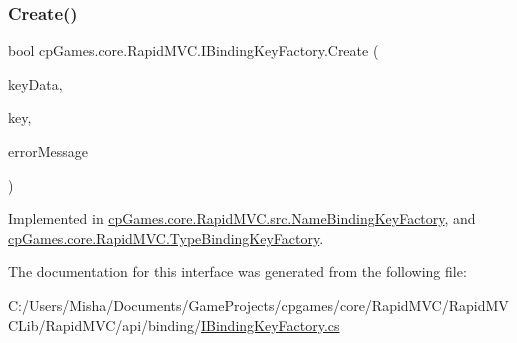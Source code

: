 \subsubsection{\texorpdfstring{Create()}{Create()}}
{\footnotesize\ttfamily bool cp\+Games.\+core.\+Rapid\+M\+V\+C.\+I\+Binding\+Key\+Factory.\+Create (\begin{DoxyParamCaption}\item[{object}]{key\+Data,  }\item[{out \mbox{\hyperlink{interfacecp_games_1_1core_1_1_rapid_m_v_c_1_1_i_binding_key}{I\+Binding\+Key}}}]{key,  }\item[{out string}]{error\+Message }\end{DoxyParamCaption})}



Implemented in \mbox{\hyperlink{classcp_games_1_1core_1_1_rapid_m_v_c_1_1src_1_1_name_binding_key_factory_a12bc08a62a5c91a8e1b8c8f6ed280cb6}{cp\+Games.\+core.\+Rapid\+M\+V\+C.\+src.\+Name\+Binding\+Key\+Factory}}, and \mbox{\hyperlink{classcp_games_1_1core_1_1_rapid_m_v_c_1_1_type_binding_key_factory_ab895639911e562ea6bbb1141911496af}{cp\+Games.\+core.\+Rapid\+M\+V\+C.\+Type\+Binding\+Key\+Factory}}.



The documentation for this interface was generated from the following file\+:\begin{DoxyCompactItemize}
\item 
C\+:/\+Users/\+Misha/\+Documents/\+Game\+Projects/cpgames/core/\+Rapid\+M\+V\+C/\+Rapid\+M\+V\+C\+Lib/\+Rapid\+M\+V\+C/api/binding/\mbox{\hyperlink{_i_binding_key_factory_8cs}{I\+Binding\+Key\+Factory.\+cs}}\end{DoxyCompactItemize}
